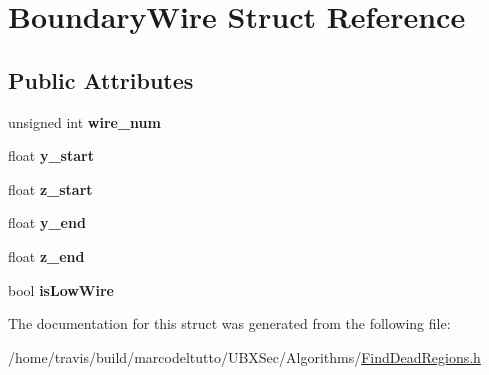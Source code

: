 \hypertarget{structBoundaryWire}{\section{Boundary\-Wire Struct Reference}
\label{structBoundaryWire}
}
\subsection*{Public Attributes}
\begin{DoxyCompactItemize}
\item 
\hypertarget{structBoundaryWire_aea1c09c6f1af43423698dd4d9ca0b86f}{unsigned int {\bfseries wire\-\_\-num}}\label{structBoundaryWire_aea1c09c6f1af43423698dd4d9ca0b86f}

\item 
\hypertarget{structBoundaryWire_a6969e3a2ea00f7a7f10e7a2a6add17a0}{float {\bfseries y\-\_\-start}}\label{structBoundaryWire_a6969e3a2ea00f7a7f10e7a2a6add17a0}

\item 
\hypertarget{structBoundaryWire_ac18920460b74370ddfaca7aaf2089283}{float {\bfseries z\-\_\-start}}\label{structBoundaryWire_ac18920460b74370ddfaca7aaf2089283}

\item 
\hypertarget{structBoundaryWire_a280aaa480170ff5f75b551e00993dc41}{float {\bfseries y\-\_\-end}}\label{structBoundaryWire_a280aaa480170ff5f75b551e00993dc41}

\item 
\hypertarget{structBoundaryWire_a5b3e58ad04ba75fb7c77cdb50cea3686}{float {\bfseries z\-\_\-end}}\label{structBoundaryWire_a5b3e58ad04ba75fb7c77cdb50cea3686}

\item 
\hypertarget{structBoundaryWire_a8ad92872ad08d86d9047a96d36255090}{bool {\bfseries is\-Low\-Wire}}\label{structBoundaryWire_a8ad92872ad08d86d9047a96d36255090}

\end{DoxyCompactItemize}


The documentation for this struct was generated from the following file\-:\begin{DoxyCompactItemize}
\item 
/home/travis/build/marcodeltutto/\-U\-B\-X\-Sec/\-Algorithms/\hyperlink{FindDeadRegions_8h}{Find\-Dead\-Regions.\-h}\end{DoxyCompactItemize}

